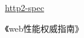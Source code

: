 \href{https://http2.github.io/}{http2-spec}


《web性能权威指南》













































